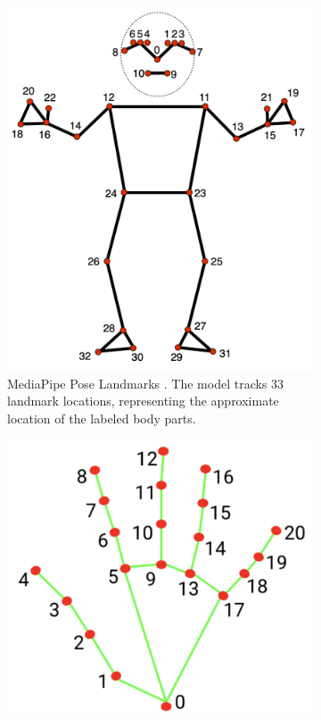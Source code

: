 \documentclass[acmsmall, screen]{acmart}
\begin{document}
\begin{figure}[htbp]
  \centering
  \begin{subfigure}[b]{0.35\linewidth}
    \centering
    \includegraphics[width=\linewidth]{assets/pose-landmarks.png}
    \caption{MediaPipe Pose Landmarks \cite{PoseLandmarkDetection}. The model tracks 33 landmark locations, representing the approximate location of the labeled body parts.}
    \label{fig:pose-landmarks}
  \end{subfigure}%
  \hspace{1em}%
  \begin{subfigure}[b]{0.35\linewidth}
    \centering
    \includegraphics[width=\linewidth]{assets/hand-landmarks.png}

\end{subfigure}
\end{figure}
\end{document}

